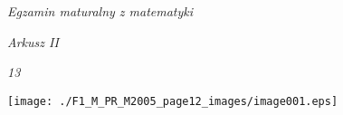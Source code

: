 \documentclass[a4paper,12pt]{article}
\begin{document}
{\it Egzamin maturalny z matematyki}

{\it Arkusz II}

{\it 13}
\begin{center}
\texttt{[image: ./F1\_M\_PR\_M2005\_page12\_images/image001.eps]}
\end{center}
\end{document}
